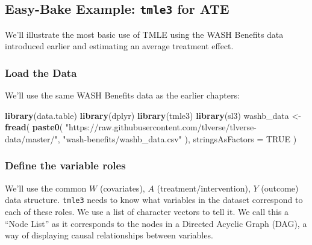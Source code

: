 \documentclass[12pt, krantz2,]{krantz}
\newenvironment{Shaded}{\begin{snugshade}}{\end{snugshade}}
\newcommand{\DataTypeTok}[1]{\textcolor[rgb]{0.27,0.27,0.27}{#1}}
\newcommand{\KeywordTok}[1]{\textcolor[rgb]{0.27,0.27,0.27}{\textbf{#1}}}
\newcommand{\NormalTok}[1]{#1}
\newcommand{\OtherTok}[1]{\textcolor[rgb]{0.37,0.37,0.37}{#1}}
\newcommand{\StringTok}[1]{\textcolor[rgb]{0.5,0.5,0.5}{#1}}
\theoremstyle{definition}
\theoremstyle{definition}
\theoremstyle{definition}
\newcommand{\1}{\mathbbm{1}}
\begin{document}
\hypertarget{easy-bake-example-tmle3-for-ate}{%
\subsection{\texorpdfstring{Easy-Bake Example: \texttt{tmle3} for ATE}{Easy-Bake Example: tmle3 for ATE}}\label{easy-bake-example-tmle3-for-ate}}

We'll illustrate the most basic use of TMLE using the WASH Benefits data
introduced earlier and estimating an average treatment effect.

\hypertarget{load-the-data}{%
\subsubsection{Load the Data}\label{load-the-data}}

We'll use the same WASH Benefits data as the earlier chapters:

\begin{Shaded}
\begin{Highlighting}[]
\KeywordTok{library}\NormalTok{(data.table)}
\KeywordTok{library}\NormalTok{(dplyr)}
\KeywordTok{library}\NormalTok{(tmle3)}
\KeywordTok{library}\NormalTok{(sl3)}
\NormalTok{washb_data <-}\StringTok{ }\KeywordTok{fread}\NormalTok{(}
  \KeywordTok{paste0}\NormalTok{(}
    \StringTok{"https://raw.githubusercontent.com/tlverse/tlverse-data/master/"}\NormalTok{,}
    \StringTok{"wash-benefits/washb_data.csv"}
\NormalTok{  ),}
  \DataTypeTok{stringsAsFactors =} \OtherTok{TRUE}
\NormalTok{)}
\end{Highlighting}
\end{Shaded}

\hypertarget{define-the-variable-roles}{%
\subsubsection{Define the variable roles}\label{define-the-variable-roles}}

We'll use the common \(W\) (covariates), \(A\) (treatment/intervention), \(Y\)
(outcome) data structure. \texttt{tmle3} needs to know what variables in the dataset
correspond to each of these roles. We use a list of character vectors to tell
it. We call this a ``Node List'' as it corresponds to the nodes in a Directed
Acyclic Graph (DAG), a way of displaying causal relationships between variables.
\end{document}

